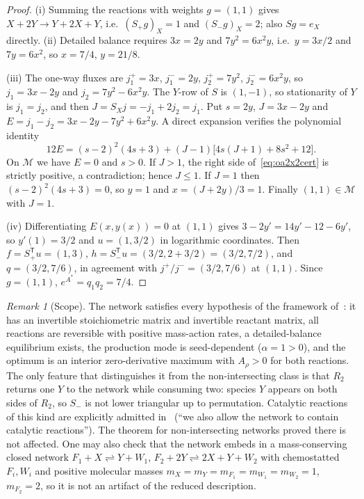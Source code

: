 \documentclass[11pt,reqno]{amsart}
\theoremstyle{plain}
\theoremstyle{definition}
\theoremstyle{remark}
\newtheorem{remark}[theorem]{Remark}
\numberwithin{equation}{section}
\newcommand{\Sp}{S_{+}}
\newcommand{\Sm}{S_{-}}
\newcommand{\T}{\mathsf{T}}
\begin{document}
\begin{proof}
(i) Summing the reactions with weights $g=(1,1)$ gives $X+2Y\to Y+2X+Y$, i.e.\ $(\Sp g)_X=1$ and $(\Sm g)_X=2$; also $Sg=e_X$ directly.  (ii) Detailed balance requires $3x=2y$ and $7y^2=6x^2y$, i.e.\ $y=3x/2$ and $7y=6x^2$, so $x=7/4$, $y=21/8$.

(iii) The one-way fluxes are $j^+_1=3x$, $j^-_1=2y$, $j^+_2=7y^2$, $j^-_2=6x^2y$, so $j_1=3x-2y$ and $j_2=7y^2-6x^2y$.  The $Y$-row of $S$ is $(1,-1)$, so stationarity of $Y$ is $j_1=j_2$, and then $J=S_Xj=-j_1+2j_2=j_1$.  Put $s=2y$, $J=3x-2y$ and $E=j_1-j_2=3x-2y-7y^2+6x^2y$.  A direct expansion verifies the polynomial identity
\begin{equation}\label{eq:oa2x2cert}
12E=(s-2)^2(4s+3)+(J-1)\big[4s(J+1)+8s^2+12\big].
\end{equation}
On $\mathcal M$ we have $E=0$ and $s>0$.  If $J>1$, the right side of~\eqref{eq:oa2x2cert} is strictly positive, a contradiction; hence $J\le1$.  If $J=1$ then $(s-2)^2(4s+3)=0$, so $y=1$ and $x=(J+2y)/3=1$.  Finally $(1,1)\in\mathcal M$ with $J=1$.

(iv) Differentiating $E(x,y(x))=0$ at $(1,1)$ gives $3-2y'=14y'-12-6y'$, so $y'(1)=3/2$ and $u=(1,3/2)$ in logarithmic coordinates.  Then $f=\Sp^{\T}u=(1,3)$, $h=\Sm^{\T}u=(3/2,2+3/2)=(3/2,7/2)$, and $q=(3/2,7/6)$, in agreement with $j^+/j^-=(3/2,7/6)$ at $(1,1)$.  Since $g=(1,1)$, $e^{A^*}=q_1q_2=7/4$.
\end{proof}

\begin{remark}[Scope]\label{rem:scope}
The network satisfies every hypothesis of the framework of~\cite{DDL24}: it has an invertible stoichiometric matrix and invertible reactant matrix, all reactions are reversible with positive mass-action rates, a detailed-balance equilibrium exists, the production mode is seed-dependent ($\alpha=1>0$), and the optimum is an interior zero-derivative maximum with $A_\rho>0$ for both reactions.  The only feature that distinguishes it from the non-intersecting class is that $R_2$ returns one $Y$ to the network while consuming two: species $Y$ appears on both sides of $R_2$, so $\Sm$ is not lower triangular up to permutation.  Catalytic reactions of this kind are explicitly admitted in~\cite{DDL24} (``we also allow the network to contain catalytic reactions'').  The theorem for non-intersecting networks proved there is not affected.  One may also check that the network embeds in a mass-conserving closed network $F_1+X\rightleftharpoons Y+W_1$, $F_2+2Y\rightleftharpoons2X+Y+W_2$ with chemostatted $F_i,W_i$ and positive molecular masses $m_X=m_Y=m_{F_1}=m_{W_1}=m_{W_2}=1$, $m_{F_2}=2$, so it is not an artifact of the reduced description.
\end{remark}
\end{document}
